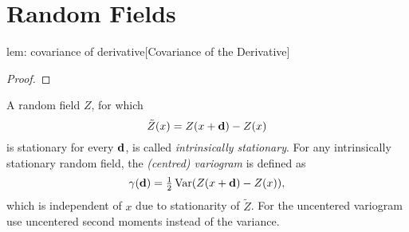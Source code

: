 \section{Random Fields}

\begin{replemma}{lem: covariance of derivative}[Covariance of the Derivative]
	
\end{replemma}
\begin{proof}
	
\end{proof}

\begin{definition}[Variogram]
	A random field \(Z\), for which
	\[
		\tilde{Z}(x) = Z(x+\mathbf{d})- Z(x)
	\]
	is stationary for every \(\mathbf{d}\), is called \emph{intrinsically stationary}.
	For any intrinsically stationary random field, the \emph{(centred) variogram} is
	defined as
	\[
		\gamma(\mathbf{d})	= \tfrac12\operatorname{Var}(Z(x+\mathbf{d})-Z(x)),
	\]
	which is independent of \(x\) due to stationarity of \(\tilde{Z}\). For the
	uncentered variogram use uncentered second moments instead of the variance.
\end{definition}

